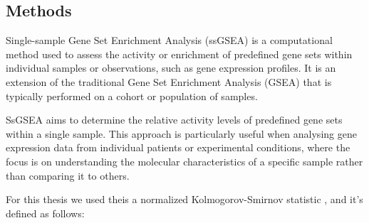 \documentclass[aps,prb,twocolumn,superscriptaddress,floatfix,longbibliography]{revtex4-2}
\newif\ifptitle
\newif\ifpnumber
\newcounter{para}
\newcommand\ptitle[1]{\par\refstepcounter{para}
{\ifpnumber{\noindent\textcolor{lightgray}{\textbf{\thepara}}\indent}\fi}
{\ifptitle{\textbf{[{#1}]}}\fi}}
\begin{document}
\subsection{Methods}

\ptitle{Rank-based statistics (ssGSEA)}

Single-sample Gene Set Enrichment Analysis (ssGSEA) is a computational method used to assess the activity or enrichment of predefined gene sets within individual samples or observations, such as gene expression profiles. It is an extension of the traditional Gene Set Enrichment Analysis (GSEA) that is typically performed on a cohort or population of samples.

SsGSEA aims to determine the relative activity levels of predefined gene sets within a single sample. This approach is particularly useful when analysing gene expression data from individual patients or experimental conditions, where the focus is on understanding the molecular characteristics of a specific sample rather than comparing it to others.

\vspace{2mm}

For this thesis we used theis a normalized Kolmogorov-Smirnov statistic \cite{diabetes}, and it's defined as follows:
\end{document}
